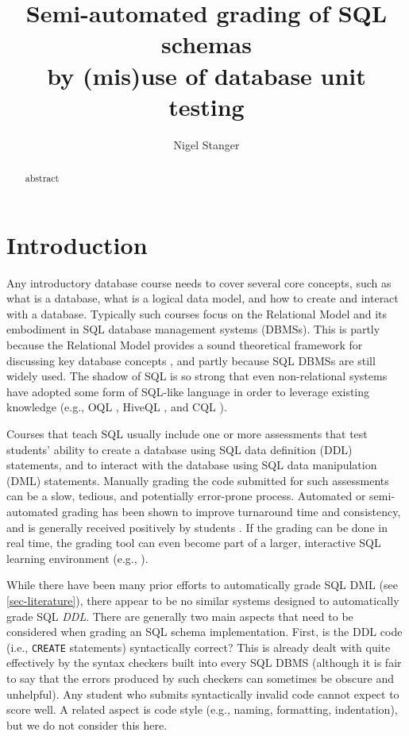 \documentclass[sigconf, authordraft, capitalise]{acmart}
\title{Semi-automated grading of SQL schemas \\ by (mis)use of database unit testing}
\author{Nigel Stanger}
\affiliation{
    \institution{University of Otago}
    \department{Department of Information Science}
    \city{Dunedin}
    \country{New Zealand}
}
\begin{document}
\begin{abstract}
    abstract
\end{abstract}

\maketitle


\section{Introduction}

Any introductory database course needs to cover several core concepts, such as what is a database, what is a logical data model, and how to create and interact with a database. Typically such courses focus on the Relational Model and its embodiment in SQL database management systems (DBMSs). This is partly because the Relational Model provides a sound theoretical framework for discussing key database concepts \cite{Date.C-2009a-SQL-and-Relational}, and partly because SQL DBMSs are still widely used. The shadow of SQL is so strong that even non-relational systems have adopted some form of SQL-like language in order to leverage existing knowledge (e.g., OQL \cite{Cattell.R-2000a-ODMG3}, HiveQL \cite{Apache-2017a-Hive}, and CQL \cite{Apache-2017a-CQL}).

Courses that teach SQL usually include one or more assessments that test students' ability to create a database using SQL data definition (DDL) statements, and to interact with the database using SQL data manipulation (DML) statements. Manually grading the code submitted for such assessments can be a slow, tedious, and potentially error-prone process. Automated or semi-automated grading has been shown to improve turnaround time and consistency, and is generally received positively by students \cite{Douce.C-2005a-Automatic,Russell.G-2004a-Improving,Dekeyser.S-2007a-Computer,Prior.J-2004a-Backwash}. If the grading can be done in real time, the grading tool can even become part of a larger, interactive SQL learning environment (e.g.,  \cite{Kenny.C-2005a-Automated,Kleiner.C-2013a-Automated,Mitrovic.A-1998a-Learning,Russell.G-2004a-Improving,Sadiq.S-2004a-SQLator}).

While there have been many prior efforts to automatically grade SQL DML (see \cref{sec-literature}), there appear to be no similar systems designed to automatically grade SQL \emph{DDL}. There are generally two main aspects that need to be considered when grading an SQL schema implementation. First, is the DDL code (i.e., \texttt{CREATE} statements) syntactically correct? This is already dealt with quite effectively by the syntax checkers built into every SQL DBMS (although it is fair to say that the errors produced by such checkers can sometimes be obscure and unhelpful). Any student who submits syntactically invalid code cannot expect to score well. A related aspect is code style (e.g., naming, formatting, indentation), but we do not consider this here.
    
\end{document}
